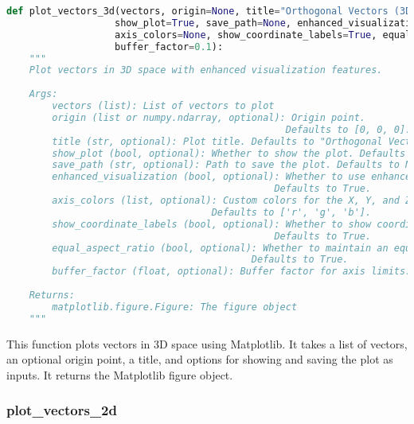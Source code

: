 \begin{lstlisting}[language=Python]
def plot_vectors_3d(vectors, origin=None, title="Orthogonal Vectors (3D)", 
                   show_plot=True, save_path=None, enhanced_visualization=True,
                   axis_colors=None, show_coordinate_labels=True, equal_aspect_ratio=True,
                   buffer_factor=0.1):
    """
    Plot vectors in 3D space with enhanced visualization features.
    
    Args:
        vectors (list): List of vectors to plot
        origin (list or numpy.ndarray, optional): Origin point. 
                                                 Defaults to [0, 0, 0].
        title (str, optional): Plot title. Defaults to "Orthogonal Vectors (3D)".
        show_plot (bool, optional): Whether to show the plot. Defaults to True.
        save_path (str, optional): Path to save the plot. Defaults to None.
        enhanced_visualization (bool, optional): Whether to use enhanced visualization features.
                                               Defaults to True.
        axis_colors (list, optional): Custom colors for the X, Y, and Z axes.
                                    Defaults to ['r', 'g', 'b'].
        show_coordinate_labels (bool, optional): Whether to show coordinate labels on the axes.
                                               Defaults to True.
        equal_aspect_ratio (bool, optional): Whether to maintain an equal aspect ratio for 3D plots.
                                           Defaults to True.
        buffer_factor (float, optional): Buffer factor for axis limits. Defaults to 0.1.
        
    Returns:
        matplotlib.figure.Figure: The figure object
    """
\end{lstlisting}

This function plots vectors in 3D space using Matplotlib. It takes a list of vectors, an optional origin point, a title, and options for showing and saving the plot as inputs. It returns the Matplotlib figure object.

\subsubsection{plot\_vectors\_2d}


